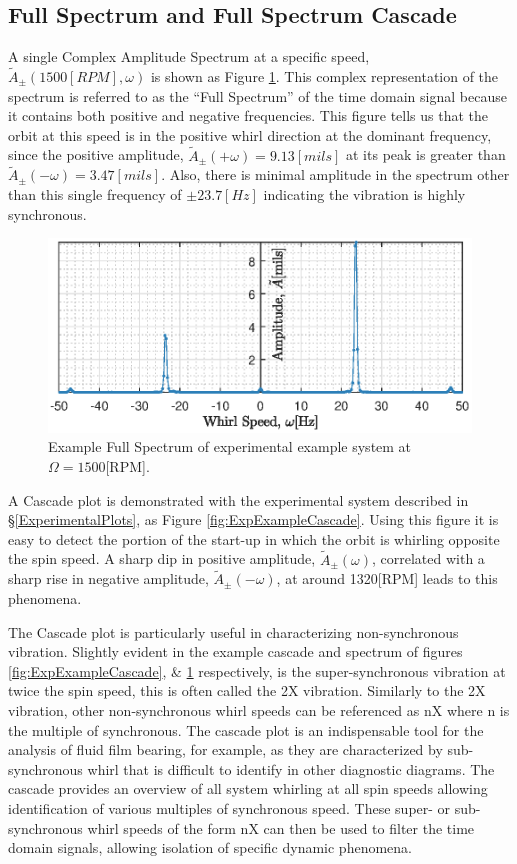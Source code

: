 \subsection{Full Spectrum and Full Spectrum Cascade}
A single Complex Amplitude Spectrum at a specific speed, $ \tilde{A}_\pm(1500[RPM],\omega) $ is shown as Figure \ref{fig:ExpExampleSpectrum}. This complex representation of the spectrum is referred to as the ``Full Spectrum'' of the time domain signal because it contains both positive and negative frequencies. This figure tells us that the orbit at this speed is in the positive whirl direction at the dominant frequency, since the positive amplitude, $ \tilde{A}_\pm(+\omega)=9.13[mils] $ at its peak is greater than $ \tilde{A}_\pm(-\omega)=3.47[mils] $. Also, there is minimal amplitude in the spectrum other than this single frequency of $ \pm23.7[Hz] $ indicating the vibration is highly synchronous.\par
\begin{figure}
	\centering
	\includegraphics[]{./figures/ExpExampleSpectrum.eps}
	\caption{Example Full Spectrum of experimental example system at $ \Omega=1500 $[RPM].}
	\label{fig:ExpExampleSpectrum}
\end{figure}
A Cascade plot is demonstrated with the experimental system described in \S\ref{ExperimentalPlots}, as Figure \ref{fig:ExpExampleCascade}. Using this figure it is easy to detect the portion of the start-up in which the orbit is whirling opposite the spin speed. A sharp dip in positive amplitude, $ \tilde{A}_\pm(\omega) $, correlated with a sharp rise in negative amplitude, $ \tilde{A}_\pm(-\omega) $, at around 1320[RPM] leads to this phenomena.\par 
The Cascade plot is particularly useful in characterizing non-synchronous vibration. Slightly evident in the example cascade and spectrum of figures \ref{fig:ExpExampleCascade}, \& \ref{fig:ExpExampleSpectrum} respectively, is the super-synchronous vibration at twice the spin speed, this is often called the 2X vibration. Similarly to the 2X vibration, other non-synchronous whirl speeds can be referenced as nX where n is the multiple of synchronous. The cascade plot is an indispensable tool for the analysis of fluid film bearing, for example, as they are characterized by sub-synchronous whirl that is difficult to identify in other diagnostic diagrams. The cascade provides an overview of all system whirling at all spin speeds allowing identification of various multiples of synchronous speed. These super- or sub-synchronous whirl speeds of the form nX can then be used to filter the time domain signals, allowing isolation of specific dynamic phenomena.\par 
